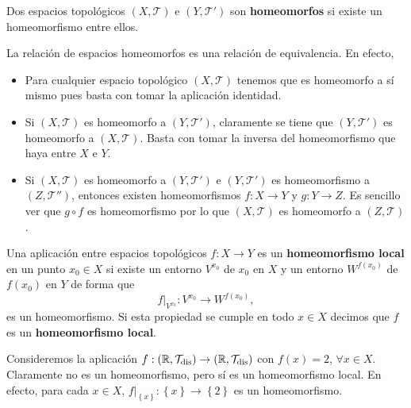 \begin{definition}
Dos espacios topológicos $\displaystyle \left(X, \mathcal{T}\right) $ e $\displaystyle \left(Y, \mathcal{T}'\right) $ son \textbf{homeomorfos} si existe un homeomorfismo entre ellos.
\end{definition}
\begin{observation}
La relación de espacios homeomorfos es una relación de equivalencia. En efecto, 
\begin{itemize}
\item Para cualquier espacio topológico $\displaystyle \left(X, \mathcal{T}\right) $ tenemos que es homeomorfo a sí mismo pues basta con tomar la aplicación identidad. 
\item Si $\displaystyle \left(X, \mathcal{T}\right) $ es homeomorfo a $\displaystyle \left(Y, \mathcal{T}'\right) $, claramente se tiene que $\displaystyle \left(Y, \mathcal{T}'\right) $ es homeomorfo a $\displaystyle \left(X, \mathcal{T}\right) $. Basta con tomar la inversa del homeomorfismo que haya entre $\displaystyle X $ e $\displaystyle Y $.
\item Si $\displaystyle \left(X, \mathcal{T}\right) $ es homeomorfo a $\displaystyle \left(Y, \mathcal{T}'\right) $ e $\displaystyle \left(Y, \mathcal{T}'\right) $ es homeomorfismo a $\displaystyle \left(Z, \mathcal{T}''\right) $, entonces existen homeomorfismos $\displaystyle f : X \to Y $ y $\displaystyle g : Y \to Z $. Es sencillo ver que $\displaystyle g\circ f $ es homeomorfismo por lo que $\displaystyle \left(X, \mathcal{T}\right) $ es homeomorfo a $\displaystyle \left(Z, \mathcal{T}\right) $. 
\end{itemize}
\end{observation}
\begin{definition}
Una aplicación entre espacios topológicos $\displaystyle f : X \to Y $ es un \textbf{homeomorfismo local} en un punto $\displaystyle x_{0} \in X $ si existe un entorno $\displaystyle V^{x_{0}} $ de $\displaystyle x_{0} $ en $\displaystyle X $ y un entorno $\displaystyle W^{f\left(x_{0}\right)} $ de $\displaystyle f\left(x_{0}\right) $ en $\displaystyle Y $ de forma que 
\[f|_{V^{x_{0}}}:V^{x_{0}}\to W^{f\left(x_{0}\right)} ,\]
es un homeomorfismo. Si esta propiedad se cumple en todo $\displaystyle x \in X $ decimos que $\displaystyle f $ es un \textbf{homeomorfismo local}.  
\end{definition}
\begin{eg}
	Consideremos la aplicación $\displaystyle f : \left(\mathbb{R}, \mathcal{T}_{\text{dis}}\right) \to \left(\mathbb{R}, \mathcal{T}_{\text{dis}}\right) $ con $\displaystyle f\left(x\right)=2 $, $\displaystyle \forall x \in X $. Claramente no es un homeomorfismo, pero sí es un homeomorfismo local. En efecto, para cada $\displaystyle x \in X $, $\displaystyle f | _{ \left\{ x\right\} } : \left\{ x\right\} \to \left\{ 2\right\}  $ es un homeomorfismo.
\end{eg}

